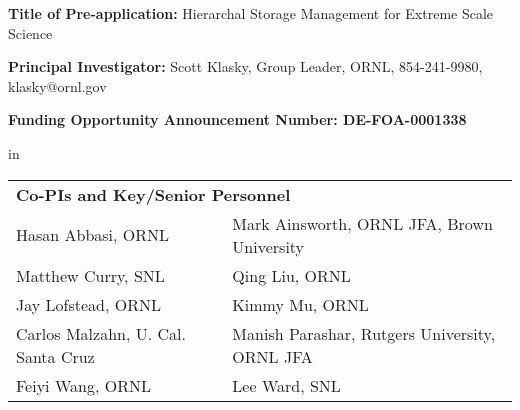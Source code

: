 \documentclass[11pt,letterpaper]{article}
\begin{document}










\setlength{\parindent}{0cm}
{\bf Title of Pre-application:}  Hierarchal Storage Management  for Extreme Scale Science\par
{\bf Principal Investigator:} Scott Klasky, Group Leader, ORNL, 854-241-9980, klasky@ornl.gov \par
{\bf Funding Opportunity Announcement Number: DE-FOA-0001338} \par
  in
\
\begin{tabular} {ll}
 \multicolumn{2}{l}{\bf Co-PIs and Key/Senior Personnel}\\
Hasan Abbasi, ORNL  & Mark Ainsworth, ORNL JFA, Brown University \\
Matthew Curry, SNL & Qing  Liu, ORNL \\
Jay Lofstead, ORNL & Kimmy Mu, ORNL \\
Carlos Malzahn, U. Cal. Santa Cruz & Manish Parashar, Rutgers University, ORNL JFA \\
Feiyi Wang, ORNL & Lee Ward, SNL
\end{tabular}
\end{document}
